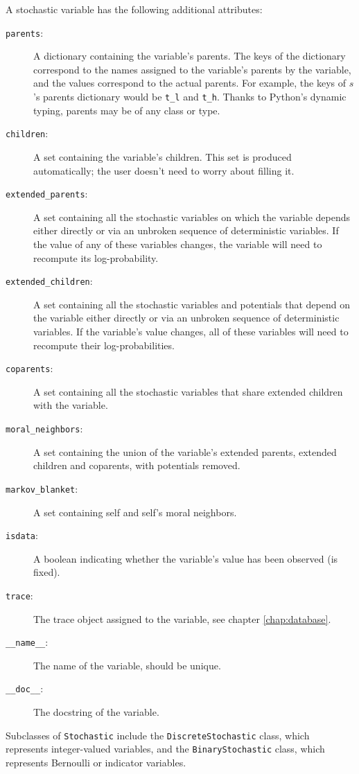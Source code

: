 A stochastic variable has the following additional attributes:
\begin{description}
    \item[\texttt{parents}:] A dictionary containing the variable's parents. The keys of the dictionary correspond to the names assigned to the variable's parents by the variable, and the values correspond to the actual parents. For example, the keys of $s$'s parents dictionary would be \texttt{t_l} and \texttt{t_h}. Thanks to Python's dynamic typing, parents may be of any class or type.
    \item[\texttt{children}:] A set containing the variable's children. This set is produced automatically; the user doesn't need to worry about filling it.
    \item[\texttt{extended_parents}:] A set containing all the stochastic variables on which the variable depends either directly or via an unbroken sequence of deterministic variables. If the value of any of these variables changes, the variable will need to recompute its log-probability.
    \item[\texttt{extended_children}:] A set containing all the stochastic variables and potentials that depend on the variable either directly or via an unbroken sequence of deterministic variables. If the variable's value changes, all of these variables will need to recompute their log-probabilities.
    \item[\texttt{coparents}:] A set containing all the stochastic variables that share extended children with the variable.
    \item[\texttt{moral_neighbors}:] A set containing the union of the variable's extended parents, extended children and coparents, with potentials removed.
    \item[\texttt{markov_blanket}:] A set containing self and self's moral neighbors.
    \item[\texttt{isdata}:] A boolean indicating whether the variable's value has been observed (is fixed).
    \item[\texttt{trace}:] The trace object assigned to the variable, see chapter \ref{chap:database}.
    \item[\texttt{__name__}:] The name of the variable, should be unique.
    \item[\texttt{__doc__}:] The docstring of the variable.
\end{description}

Subclasses of \texttt{Stochastic} include the \texttt{DiscreteStochastic} class, which represents integer-valued variables, and the \texttt{BinaryStochastic} class, which represents Bernoulli or indicator variables. 

